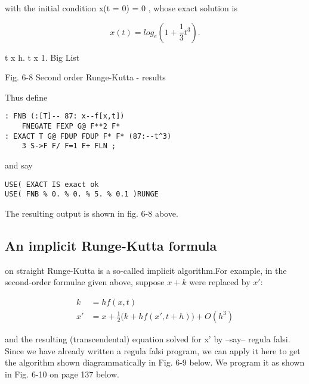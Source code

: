 with the initial condition x(t = 0) = 0 , whose exact solution is

\begin{equation}
x(t) =log_e(1 +\frac{1}{3}t^3).
    \label{eq:06_22} 
\end{equation}

t x h. t x 1.
Big List

Fig. 6-8 Second order Runge-Kutta - results

Thus define

\begin{lstlisting}
: FNB (:[T]-- 87: x--f[x,t])
    FNEGATE FEXP G@ F**2 F*
: EXACT T G@ FDUP FDUP F* F* (87:--t^3)
    3 S->F F/ F=1 F+ FLN ;
\end{lstlisting}

and say

\begin{lstlisting}
USE( EXACT IS exact ok
USE( FNB % 0. % 0. % 5. % 0.1 )RUNGE
\end{lstlisting}

The resulting output is shown in fig. 6-8 above.

\subsection{An implicit Runge-Kutta formula}
 on straight Runge-Kutta is a so-called implicit algorithm.For example, in the second-order formulae given above, suppose $x + k$ were replaced by $x'$:

\begin{equation}
\begin{aligned}
    k &= hf(x,t)\\
    x' &= x + \frac{1}{2}\big(k + hf(x',t+h)\big) + O(h^3)
    \label{eq:06_23} 
\end{aligned}
\end{equation}

and the resulting (transcendental) equation solved for x' by --say-- regula falsi. Since we have already written a regula falsi program, we can apply it here to get the algorithm shown diagrammatically in Fig. 6-9 below. We program it as shown in Fig. 6-10 on page 137 below.

